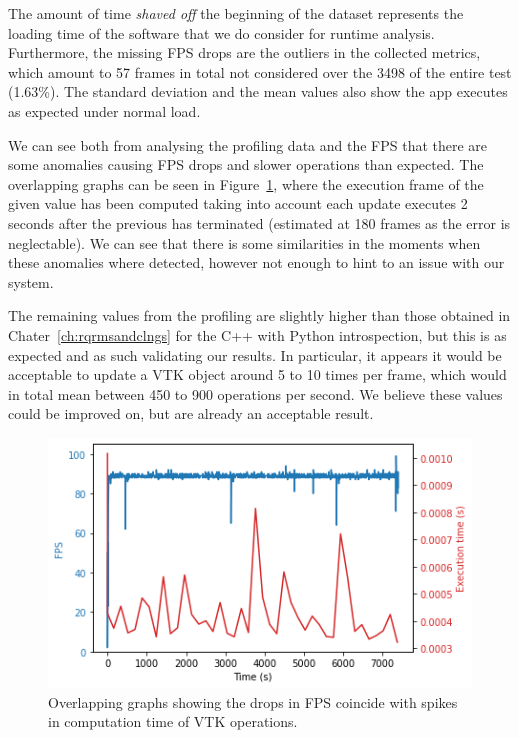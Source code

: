The amount of time \textit{shaved off} the beginning of the dataset represents the loading time of the software that we do consider for runtime analysis. Furthermore, the missing FPS drops are the outliers in the collected metrics, which amount to 57 frames in total not considered over the 3498 of the entire test (1.63\%). The standard deviation and the mean values also show the app executes as expected under normal load.

We can see both from analysing the profiling data and the FPS that there are some anomalies causing FPS drops and slower operations than expected. The overlapping graphs can be seen in Figure~\ref{fig:overlapping-cone-source-graphs}, where the execution frame of the given value has been computed taking into account each update executes 2 seconds after the previous has terminated (estimated at 180 frames as the error is neglectable). We can see that there is some similarities in the moments when these anomalies where detected, however not enough to hint to an issue with our system.

The remaining values from the profiling are slightly higher than those obtained in Chater~\ref{ch:rqrmsandclngs} for the C++ with Python introspection, but this is as expected and as such validating our results. In particular, it appears it would be acceptable to update a VTK object around 5 to 10 times per frame, which would in total mean between 450 to 900 operations per second. We believe these values could be improved on, but are already an acceptable result.

\begin{figure}[t]
    \centering
    \includegraphics[width=\textwidth]{pictures/analysis cone/output_19_1.png}
    \caption{Overlapping graphs showing the drops in FPS coincide with spikes in computation time of VTK operations.}
    \label{fig:overlapping-cone-source-graphs}
\end{figure}

